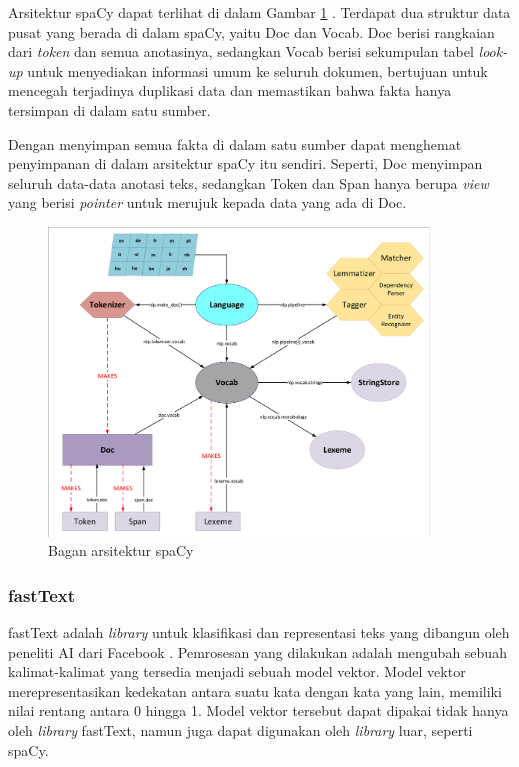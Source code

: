 Arsitektur spaCy dapat terlihat di dalam Gambar \ref{fig:spaCy_arch} \parencite{spacy2}. Terdapat dua struktur data pusat yang berada di dalam spaCy, yaitu Doc dan Vocab. Doc berisi rangkaian dari \textit{token} dan semua anotasinya, sedangkan Vocab berisi sekumpulan tabel \textit{look-up} untuk menyediakan informasi umum ke seluruh dokumen, bertujuan untuk mencegah terjadinya duplikasi data dan memastikan bahwa fakta hanya tersimpan di dalam satu sumber.

Dengan menyimpan semua fakta di dalam satu sumber dapat menghemat penyimpanan di dalam arsitektur spaCy itu sendiri. Seperti, Doc menyimpan seluruh data-data anotasi teks, sedangkan Token dan Span hanya berupa \textit{view} yang berisi \textit{pointer} untuk merujuk kepada data yang ada di Doc.

\begin{figure}[H]
	\centering
	\includegraphics[width=0.9\textwidth, trim=2 2 2 2, clip]{resources/3-spacy_arch.pdf}
	\caption{Bagan arsitektur spaCy \parencite{spacy2}}
	\label{fig:spaCy_arch}
\end{figure}

\subsubsection{fastText}

fastText adalah \textit{library} untuk klasifikasi dan representasi teks yang dibangun oleh peneliti AI dari Facebook \parencite{joulin2017bag}. Pemrosesan yang dilakukan adalah mengubah sebuah kalimat-kalimat yang tersedia menjadi sebuah model vektor. Model vektor merepresentasikan kedekatan antara suatu kata dengan kata yang lain, memiliki nilai rentang antara 0 hingga 1. Model vektor tersebut dapat dipakai tidak hanya oleh \textit{library} fastText, namun juga dapat digunakan oleh \textit{library} luar, seperti spaCy.

